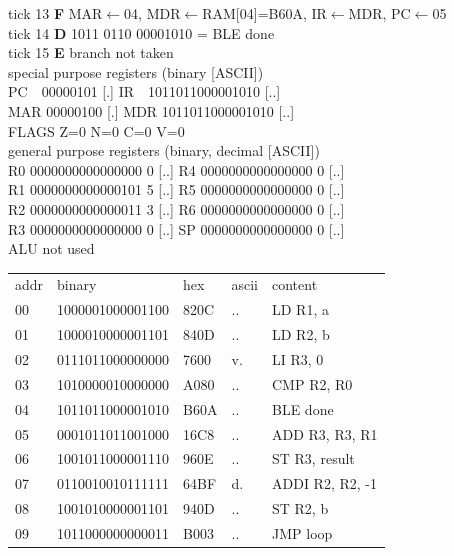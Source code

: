 \noindent\begin{tcolorbox}[stepbox, title={Instruction 5 \hfill ticks 13 to 15 \quad BLE done}]
\textcolor{dim}{tick 13} \textbf{F} MAR$\leftarrow$04, MDR$\leftarrow$RAM[04]=B60A, IR$\leftarrow$MDR, PC$\leftarrow$05\\
\textcolor{dim}{tick 14} \textbf{D} 1011 0110 00001010 = BLE done\\
\textcolor{dim}{tick 15} \textbf{E} branch not taken\\[2pt]
\textcolor{dim}{special purpose registers (binary [ASCII])}\\
PC~~00000101 [.] \hfill IR~~1011011000001010 [..]\\
MAR 00000100 [.] \hfill MDR 1011011000001010 [..]\\
FLAGS Z=0 N=0 C=0 V=0\\[2pt]
\textcolor{dim}{general purpose registers (binary, decimal [ASCII])}\\
R0 0000000000000000 0 [..] \hfill R4 0000000000000000 0 [..]\\
R1 0000000000000101 5 [..] \hfill R5 0000000000000000 0 [..]\\
R2 0000000000000011 3 [..] \hfill R6 0000000000000000 0 [..]\\
R3 0000000000000000 0 [..] \hfill SP 0000000000000000 0 [..]\\
\textcolor{dim}{ALU not used}\\[2pt]
{\setlength{\tabcolsep}{2pt}\begin{tabular}{@{}lllll@{}}
\textcolor{dim}{addr} & \textcolor{dim}{binary} & \textcolor{dim}{hex} & \textcolor{dim}{ascii} & \textcolor{dim}{content}\\
00 & 1000001000001100 & 820C & .. & LD R1, a\\
01 & 1000010000001101 & 840D & .. & LD R2, b\\
02 & 0111011000000000 & 7600 & v. & LI R3, 0\\
03 & 1010000010000000 & A080 & .. & CMP R2, R0\\
04 & 1011011000001010 & B60A & .. & BLE done\\
\rowcolor{pcc}05 & 0001011011001000 & 16C8 & .. & ADD R3, R3, R1\\
06 & 1001011000001110 & 960E & .. & ST R3, result\\
07 & 0110010010111111 & 64BF & d. & ADDI R2, R2, -1\\
08 & 1001010000001101 & 940D & .. & ST R2, b\\
09 & 1011000000000011 & B003 & .. & JMP loop\\

\end{tabular}}
\end{tcolorbox}
